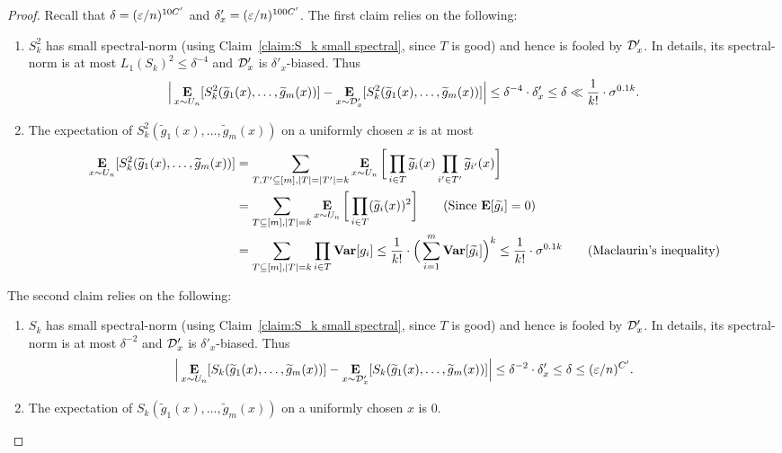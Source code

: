 \begin{proof}
	Recall that $\delta = (\varepsilon/n)^{10C'}$ and $\delta'_x = (\varepsilon/n)^{100C'}$. The first claim relies on the following:
	 \begin{enumerate}
		\item $S_k^2$ has small spectral-norm (using Claim~\ref{claim:S_k small spectral}, since $T$ is good) and hence is fooled by ${\mathcal{D}'_x}$. In details, its spectral-norm is at most $L_1(S_k)^2 \le \delta^{-4}$ and ${\mathcal{D}'_x}$ is $\delta'_x$-biased. Thus $$\Big|\mathop{\bf E\/}_{x\sim U_n}[S_k^2(\widetilde{g}_1(x), \ldots, \widetilde{g}_m(x))] - \mathop{\bf E\/}_{x\sim {\mathcal{D}'_x}}[S_k^2(\widetilde{g}_1(x), \ldots, \widetilde{g}_m(x))]\Big| \le \delta^{-4} \cdot \delta'_x \le \delta \ll \frac{1}{k!} \cdot \sigma^{0.1 k}.$$
		\item 	The expectation of $S_k^2(\tilde{g}_1(x), \ldots, \tilde{g}_m(x))$ on a uniformly chosen $x$ is at most 
\begin{align*}\E_{x\sim U_n}[S_k^2(\tilde{g}_1(x), \ldots, \tilde{g}_m(x))] &= \sum_{T, T' \subseteq [m], |T|=|T'|=k} \E_{x\sim U_n} \bigg[\prod_{i\in T} \tilde{g}_i(x)\prod_{i'\in T'} \tilde{g}_{i'}(x)\bigg]\\
&=	\sum_{T\subseteq [m], |T|=k} \E_{x\sim U_n} \bigg[\prod_{i\in T} (\tilde{g}_i(x))^2\bigg] \tag{Since $\E[\tilde{g_i}] = 0$}\\
&
=	\sum_{T\subseteq [m], |T|=k} \prod_{i\in T} \var[{g}_i] \le  \frac{1}{k!} \cdot \Big(\sum_{i=1}^{m}{\var[\tilde{g_i}]}\Big)^{k} \le \frac{1}{k!} \cdot \sigma^{0.1k} \tag{Maclaurin's inequality}
\end{align*}



	\end{enumerate} 
	The second claim relies on the following:	
	\begin{enumerate}
		\item $S_k$ has small spectral-norm (using Claim~\ref{claim:S_k small spectral}, since $T$ is good) and hence is fooled by ${\mathcal{D}'_x}$. In details, its spectral-norm is at most $\delta^{-2}$ and ${\mathcal{D}'_x}$ is $\delta'_x$-biased. Thus $$\Big|\mathop{\bf E\/}_{x\sim U_n}[S_k(\widetilde{g}_1(x), \ldots, \widetilde{g}_m(x))] - \mathop{\bf E\/}_{x\sim {\mathcal{D}'_x}}[S_k(\widetilde{g}_1(x), \ldots, \widetilde{g}_m(x))]\Big| \le \delta^{-2} \cdot \delta'_x \le \delta \le (\varepsilon/n)^{C'}.$$

		\item The expectation of $S_k(\tilde{g}_1(x), \ldots, \tilde{g}_m(x))$ on a uniformly chosen $x$ is $0$.	
		\qedhere
		\end{enumerate} 
\end{proof}

